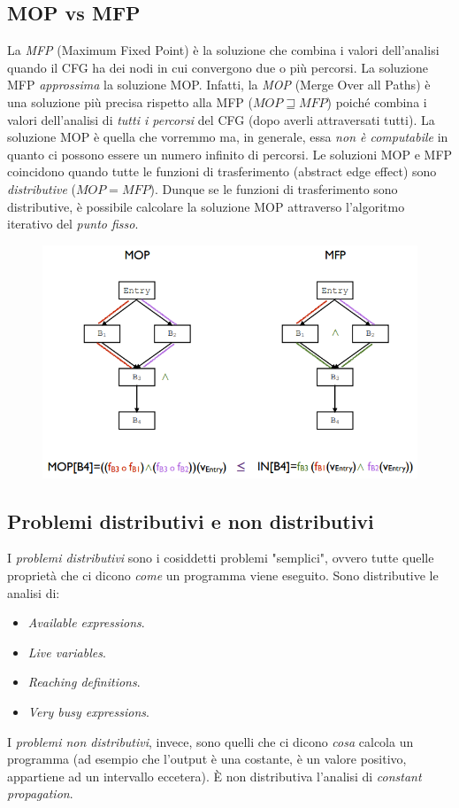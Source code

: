 \documentclass[a4paper,oneside,titlepage]{book}
\begin{document}
\subsection{MOP vs MFP}
La \textit{MFP} (Maximum Fixed Point) è la soluzione che combina i valori dell'analisi quando il CFG ha dei nodi in cui convergono due o più percorsi. La soluzione MFP \textit{approssima} la soluzione MOP. Infatti, la \textit{MOP} (Merge Over all Paths) è una soluzione più precisa rispetto alla MFP ($MOP \sqsupseteq MFP$) poiché combina i valori dell'analisi di \textit{tutti i percorsi} del CFG (dopo averli attraversati tutti). La soluzione MOP è quella che vorremmo ma, in generale, essa \textit{non è computabile} in quanto ci possono essere un numero infinito di percorsi. Le soluzioni MOP e MFP coincidono quando tutte le funzioni di trasferimento (abstract edge effect) sono \textit{distributive} ($MOP = MFP$). Dunque se le funzioni di trasferimento sono distributive, è possibile calcolare la soluzione MOP attraverso l'algoritmo iterativo del \textit{punto fisso}.
\begin{figure}[htp]
	\centering
	\includegraphics[width=\textwidth, height=\textheight, keepaspectratio]{MOPvsMFP.png}
\end{figure}

\subsection{Problemi distributivi e non distributivi}
I \textit{problemi distributivi} sono i cosiddetti problemi "semplici", ovvero tutte quelle proprietà che ci dicono \textit{come} un programma viene eseguito. Sono distributive le analisi di:
\begin{itemize}
    \item \textit{Available expressions}.
    \item \textit{Live variables}.
    \item \textit{Reaching definitions}.
    \item \textit{Very busy expressions}.
\end{itemize}
I \textit{problemi non distributivi}, invece, sono quelli che ci dicono \textit{cosa} calcola un programma (ad esempio che l'output è una costante, è un valore positivo, appartiene ad un intervallo eccetera). \`{E} non distributiva l'analisi di \textit{constant propagation}.
\end{document}
